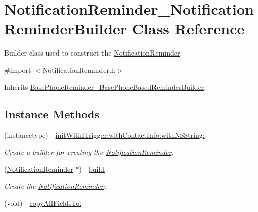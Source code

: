 \hypertarget{interface_notification_reminder___notification_reminder_builder}{}\section{Notification\+Reminder\+\_\+\+Notification\+Reminder\+Builder Class Reference}
\label{interface_notification_reminder___notification_reminder_builder}


Builder class used to construct the \hyperlink{interface_notification_reminder}{Notification\+Reminder}.  




{\ttfamily \#import $<$Notification\+Reminder.\+h$>$}



Inherits \hyperlink{interface_base_phone_reminder___base_phone_based_reminder_builder}{Base\+Phone\+Reminder\+\_\+\+Base\+Phone\+Based\+Reminder\+Builder}.

\subsection*{Instance Methods}
\begin{DoxyCompactItemize}
\item 
(instancetype) -\/ \hyperlink{interface_notification_reminder___notification_reminder_builder_a81757767696178eddc5965f59a67e10e}{init\+With\+I\+Trigger\+:with\+Contact\+Info\+:with\+N\+S\+String\+:}
\begin{DoxyCompactList}\small\item\em Create a builder for creating the \hyperlink{interface_notification_reminder}{Notification\+Reminder}. \end{DoxyCompactList}\item 
(\hyperlink{interface_notification_reminder}{Notification\+Reminder} $\ast$) -\/ \hyperlink{interface_notification_reminder___notification_reminder_builder_ace3be92622f45a7da7b779aa88cdaaeb}{build}
\begin{DoxyCompactList}\small\item\em Create the \hyperlink{interface_notification_reminder}{Notification\+Reminder}. \end{DoxyCompactList}\item 
(void) -\/ \hyperlink{interface_notification_reminder___notification_reminder_builder_a56254de6d9b36166d86c31c053db4556}{copy\+All\+Fields\+To\+:}
\end{DoxyCompactItemize}

